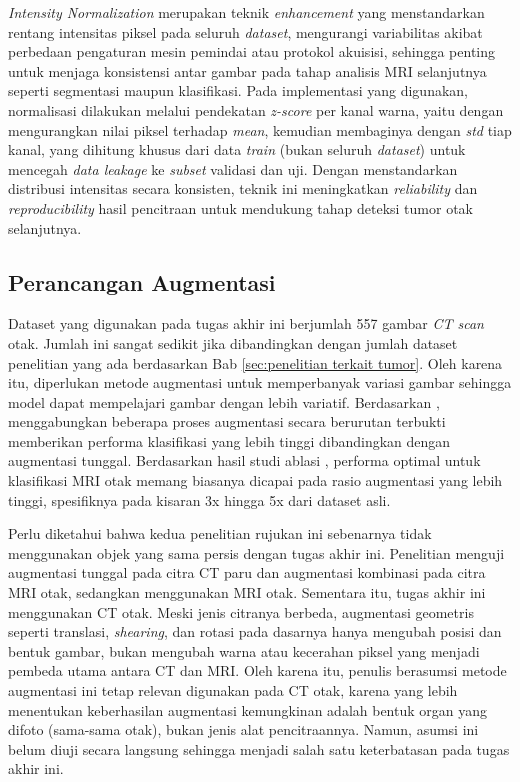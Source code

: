 \begin{enumerate}
	\textit{Intensity Normalization} merupakan teknik \textit{enhancement} yang menstandarkan rentang intensitas piksel pada seluruh \textit{dataset}, mengurangi variabilitas akibat perbedaan pengaturan mesin pemindai atau protokol akuisisi, sehingga penting untuk menjaga konsistensi antar gambar pada tahap analisis MRI selanjutnya seperti segmentasi maupun klasifikasi. Pada implementasi yang digunakan, normalisasi dilakukan melalui pendekatan \textit{z-score} per kanal warna, yaitu dengan mengurangkan nilai piksel terhadap \textit{mean}, kemudian membaginya dengan \textit{std} tiap kanal, yang dihitung khusus dari data \textit{train} (bukan seluruh \textit{dataset}) untuk mencegah \textit{data leakage} ke \textit{subset} validasi dan uji. Dengan menstandarkan distribusi intensitas secara konsisten, teknik ini meningkatkan \textit{reliability} dan \textit{reproducibility} hasil pencitraan untuk mendukung tahap deteksi tumor otak selanjutnya.
\end{enumerate}

\subsection{ Perancangan Augmentasi}
Dataset yang digunakan pada tugas akhir ini berjumlah 557 gambar \textit{CT scan} otak. Jumlah ini sangat sedikit jika dibandingkan dengan jumlah dataset penelitian yang ada berdasarkan Bab \ref{sec:penelitian terkait tumor}. Oleh karena itu, diperlukan metode augmentasi untuk memperbanyak variasi gambar sehingga model dapat mempelajari gambar dengan lebih variatif. Berdasarkan \autocite{goceri2023medical}, menggabungkan beberapa proses augmentasi secara berurutan terbukti memberikan performa klasifikasi yang lebih tinggi dibandingkan dengan augmentasi tunggal. Berdasarkan hasil studi ablasi \autocite{hossain2025mgaug}, performa optimal untuk klasifikasi MRI otak memang biasanya dicapai pada rasio augmentasi yang lebih tinggi, spesifiknya pada kisaran 3x hingga 5x dari dataset asli.

Perlu diketahui bahwa kedua penelitian rujukan ini sebenarnya tidak menggunakan objek yang sama persis dengan tugas akhir ini. Penelitian \autocite{goceri2023medical} menguji augmentasi tunggal pada citra CT paru dan augmentasi kombinasi pada citra MRI otak, sedangkan \autocite{hossain2025mgaug} menggunakan MRI otak. Sementara itu, tugas akhir ini menggunakan CT otak. Meski jenis citranya berbeda, augmentasi geometris seperti translasi, \textit{shearing}, dan rotasi pada dasarnya hanya mengubah posisi dan bentuk gambar, bukan mengubah warna atau kecerahan piksel yang menjadi pembeda utama antara CT dan MRI. Oleh karena itu, penulis berasumsi metode augmentasi ini tetap relevan digunakan pada CT otak, karena yang lebih menentukan keberhasilan augmentasi kemungkinan adalah bentuk organ yang difoto (sama-sama otak), bukan jenis alat pencitraannya. Namun, asumsi ini belum diuji secara langsung sehingga menjadi salah satu keterbatasan pada tugas akhir ini.

